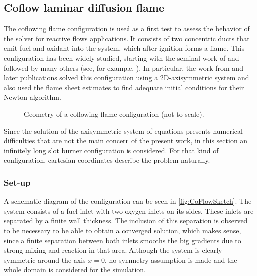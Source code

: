 \subsection{Coflow laminar diffusion flame}\label{ssec:coflowFlame}
The coflowing flame configuration is used as a first test to assess the behavior of the solver for reactive flows applications. It consists of two concentric ducts that emit fuel and oxidant into the system, which after ignition forms a flame. This configuration has been widely studied, starting with the seminal work of \textcite{burkeDiffusionFlames1928} and followed by many others (see, for example, \textcite{smookeNumericalModelingAxisymmetric1992, smookeNumericalSolutionTwoDimensional1986,braackAdaptiveFiniteElement1997}). In particular, the work from \textcite{smookeNumericalModelingAxisymmetric1992} and later publications solved this configuration using a 2D-axisymmetric system and also used the flame sheet estimates to find adequate initial conditions for their Newton algorithm. 
\begin{figure}[t]
	\centering
	\def\svgwidth{0.38\textwidth}
	\qquad\quad
	\def\svgwidth{0.35\textwidth}
	\caption{Geometry of a coflowing flame configuration (not to scale).} \label{fig:CoFlowGeometry}
\end{figure}

Since the solution of the axisymmetric system of equations presents numerical difficulties that are not the main concern of the present work, in this section an infinitely long slot burner configuration is considered. For that kind of configuration, cartesian coordinates describe the problem naturally. 
\subsubsection{Set-up}
A schematic diagram of the configuration can be seen in \cref{fig:CoFlowSketch}. The system consists of a fuel inlet with two oxygen inlets on its sides. These inlets are separated by a finite wall thickness. The inclusion of this separation is observed to be necessary to be able to obtain a converged solution, which makes sense, since a finite separation between both inlets smooths the big gradients due to strong mixing and reaction in that area. Although the system is clearly symmetric around the axis $x = 0$, no symmetry assumption is made and the whole domain is considered for the simulation.

